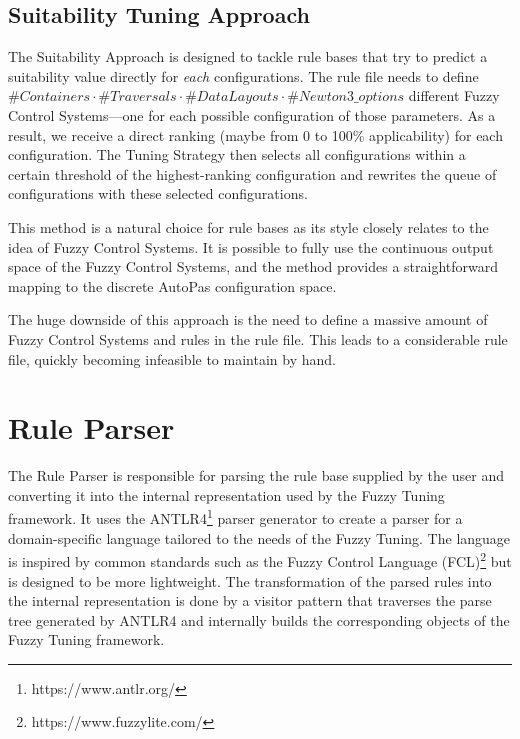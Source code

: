 

\subsection{Suitability Tuning Approach}

The Suitability Approach is designed to tackle rule bases that try to predict a suitability value directly for \emph{each} configurations. The rule file needs to define $\#Containers \cdot \#Traversals \cdot \#DataLayouts \cdot \#Newton3\_options$ different Fuzzy Control Systems—one for each possible configuration of those parameters. As a result, we receive a direct ranking (maybe from 0 to 100\% applicability) for each configuration. The Tuning Strategy then selects all configurations within a certain threshold of the highest-ranking configuration and rewrites the queue of configurations with these selected configurations.

This method is a natural choice for rule bases as its style closely relates to the idea of Fuzzy Control Systems. It is possible to fully use the continuous output space of the Fuzzy Control Systems, and the method provides a straightforward mapping to the discrete AutoPas configuration space.

The huge downside of this approach is the need to define a massive amount of Fuzzy Control Systems and rules in the rule file. This leads to a considerable rule file, quickly becoming infeasible to maintain by hand.




\section{Rule Parser}

The Rule Parser is responsible for parsing the rule base supplied by the user and converting it into the internal representation used by the Fuzzy Tuning framework. It uses the ANTLR4\footnote{https://www.antlr.org/} parser generator to create a parser for a domain-specific language tailored to the needs of the Fuzzy Tuning. The language is inspired by common standards such as the Fuzzy Control Language (FCL)\footnote{https://www.fuzzylite.com/} but is designed to be more lightweight. The transformation of the parsed rules into the internal representation is done by a visitor pattern that traverses the parse tree generated by ANTLR4 and internally builds the corresponding objects of the Fuzzy Tuning framework.